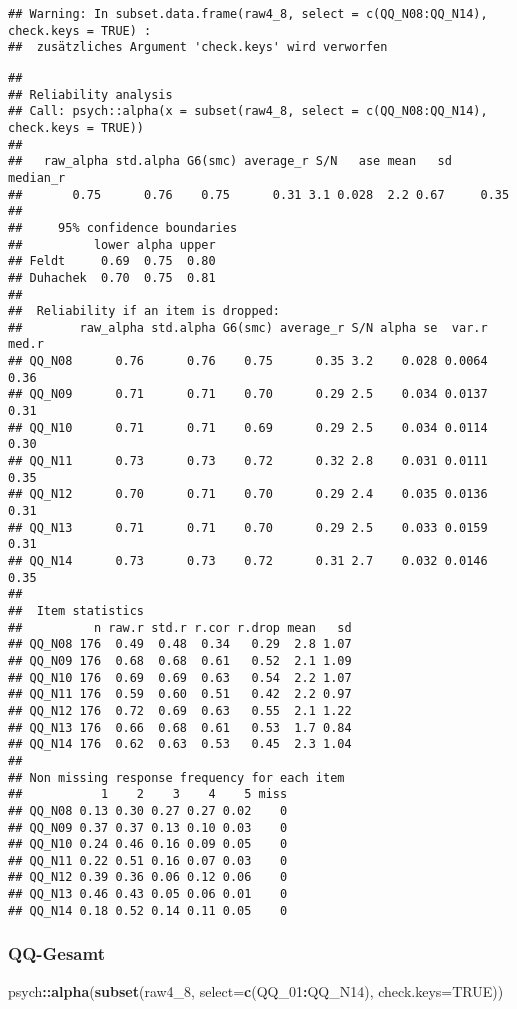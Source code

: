 \documentclass[
]{article}
\newenvironment{Shaded}{\begin{snugshade}}{\end{snugshade}}
\newcommand{\AttributeTok}[1]{\textcolor[rgb]{0.13,0.29,0.53}{#1}}
\newcommand{\ConstantTok}[1]{\textcolor[rgb]{0.56,0.35,0.01}{#1}}
\newcommand{\FunctionTok}[1]{\textcolor[rgb]{0.13,0.29,0.53}{\textbf{#1}}}
\newcommand{\NormalTok}[1]{#1}
\newcommand{\SpecialCharTok}[1]{\textcolor[rgb]{0.81,0.36,0.00}{\textbf{#1}}}
\begin{document}
\begin{verbatim}
## Warning: In subset.data.frame(raw4_8, select = c(QQ_N08:QQ_N14), check.keys = TRUE) :
##  zusätzliches Argument 'check.keys' wird verworfen
\end{verbatim}

\begin{verbatim}
## 
## Reliability analysis   
## Call: psych::alpha(x = subset(raw4_8, select = c(QQ_N08:QQ_N14), check.keys = TRUE))
## 
##   raw_alpha std.alpha G6(smc) average_r S/N   ase mean   sd median_r
##       0.75      0.76    0.75      0.31 3.1 0.028  2.2 0.67     0.35
## 
##     95% confidence boundaries 
##          lower alpha upper
## Feldt     0.69  0.75  0.80
## Duhachek  0.70  0.75  0.81
## 
##  Reliability if an item is dropped:
##        raw_alpha std.alpha G6(smc) average_r S/N alpha se  var.r med.r
## QQ_N08      0.76      0.76    0.75      0.35 3.2    0.028 0.0064  0.36
## QQ_N09      0.71      0.71    0.70      0.29 2.5    0.034 0.0137  0.31
## QQ_N10      0.71      0.71    0.69      0.29 2.5    0.034 0.0114  0.30
## QQ_N11      0.73      0.73    0.72      0.32 2.8    0.031 0.0111  0.35
## QQ_N12      0.70      0.71    0.70      0.29 2.4    0.035 0.0136  0.31
## QQ_N13      0.71      0.71    0.70      0.29 2.5    0.033 0.0159  0.31
## QQ_N14      0.73      0.73    0.72      0.31 2.7    0.032 0.0146  0.35
## 
##  Item statistics 
##          n raw.r std.r r.cor r.drop mean   sd
## QQ_N08 176  0.49  0.48  0.34   0.29  2.8 1.07
## QQ_N09 176  0.68  0.68  0.61   0.52  2.1 1.09
## QQ_N10 176  0.69  0.69  0.63   0.54  2.2 1.07
## QQ_N11 176  0.59  0.60  0.51   0.42  2.2 0.97
## QQ_N12 176  0.72  0.69  0.63   0.55  2.1 1.22
## QQ_N13 176  0.66  0.68  0.61   0.53  1.7 0.84
## QQ_N14 176  0.62  0.63  0.53   0.45  2.3 1.04
## 
## Non missing response frequency for each item
##           1    2    3    4    5 miss
## QQ_N08 0.13 0.30 0.27 0.27 0.02    0
## QQ_N09 0.37 0.37 0.13 0.10 0.03    0
## QQ_N10 0.24 0.46 0.16 0.09 0.05    0
## QQ_N11 0.22 0.51 0.16 0.07 0.03    0
## QQ_N12 0.39 0.36 0.06 0.12 0.06    0
## QQ_N13 0.46 0.43 0.05 0.06 0.01    0
## QQ_N14 0.18 0.52 0.14 0.11 0.05    0
\end{verbatim}

\subsubsection{QQ-Gesamt}\label{qq-gesamt}

\begin{Shaded}
\begin{Highlighting}[]
\NormalTok{psych}\SpecialCharTok{::}\FunctionTok{alpha}\NormalTok{(}\FunctionTok{subset}\NormalTok{(raw4\_8, }\AttributeTok{select=}\FunctionTok{c}\NormalTok{(QQ\_01}\SpecialCharTok{:}\NormalTok{QQ\_N14), }\AttributeTok{check.keys=}\ConstantTok{TRUE}\NormalTok{))}
\end{Highlighting}
\end{Shaded}
\end{document}
